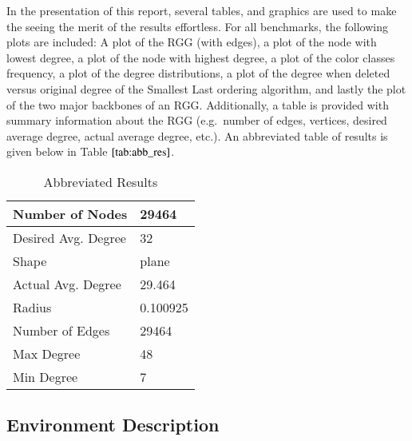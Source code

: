 \documentclass[]{elsarticle} %
\begin{document}
In the presentation of this report, several tables, and graphics are
used to make the seeing the merit of the results effortless. For all
benchmarks, the following plots are included: A plot of the RGG (with
edges), a plot of the node with lowest degree, a plot of the node with
highest degree, a plot of the color classes frequency, a plot of the
degree distributions, a plot of the degree when deleted versus original
degree of the Smallest Last ordering algorithm, and lastly the plot of
the two major backbones of an RGG. Additionally, a table is provided
with summary information about the RGG (e.g.~number of edges, vertices,
desired average degree, actual average degree, etc.). An abbreviated
table of results is given below in Table \(\ref{tab:abb_res}\).

\begin{table}

\caption{\label{tab:abb_res}Abbreviated Results}
\centering
\begin{tabular}[t]{l|l}
\hline
Number of Nodes & 29464\\
\hline
Desired Avg. Degree & 32\\
\hline
Shape & plane\\
\hline
Actual Avg. Degree & 29.464\\
\hline
Radius & 0.100925\\
\hline
Number of Edges & 29464\\
\hline
Max Degree & 48\\
\hline
Min Degree & 7\\
\hline
\end{tabular}
\end{table}

\subsection{Environment Description}\label{environment-description}
\end{document}
